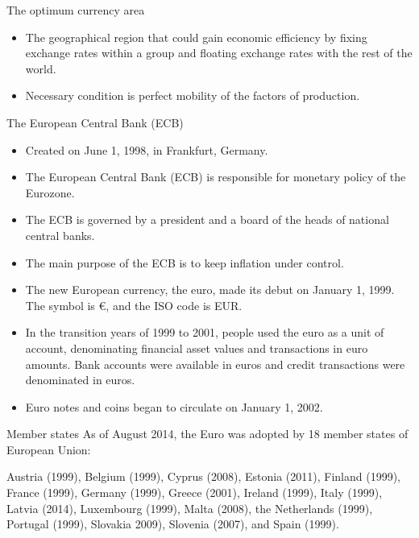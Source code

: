 \documentclass[international_finance_p1.tex]{subfiles}
\begin{document}
\begin{frame}{The optimum currency area}
\begin{itemize}[<+->]
\item
The geographical region that could gain economic efficiency by fixing exchange rates within a group and floating exchange rates with the rest of the world. 
\item
Necessary condition is perfect mobility of the factors of production.
\end{itemize}
\end{frame}

\begin{frame}{The European Central Bank (ECB)}
\begin{itemize}[<+->]
\item
Created on June 1, 1998, in Frankfurt, Germany. 
\item
The European Central Bank (ECB) is responsible for monetary policy of the Eurozone. 
\item
The ECB is governed by a president and a board of the heads of national central banks. 
\item
The main purpose of the ECB is to keep inflation under control.
\end{itemize}
\end{frame}
\begin{frame}{}
\begin{itemize}[<+->]
\item
The new European currency, the euro, made its debut on January 1, 1999. The symbol is €, and the ISO code is EUR. 
\item
In the transition years of 1999 to 2001, people used the euro as a unit of account, denominating financial asset values and transactions in euro amounts. Bank accounts were available in euros and credit transactions were denominated in euros. 
\item
Euro notes and coins began to circulate on January 1, 2002.
\end{itemize}
\end{frame}
\begin{frame}{Member states}
As of August 2014, the Euro was adopted by 18 member states of European Union: 

Austria (1999), Belgium (1999), Cyprus (2008), Estonia (2011), Finland (1999), France (1999), Germany (1999), Greece (2001), Ireland (1999), Italy (1999), Latvia (2014), Luxembourg (1999), Malta (2008), the Netherlands (1999), Portugal (1999), Slovakia 2009), Slovenia (2007), and Spain (1999). 

\end{frame}
\end{document}

